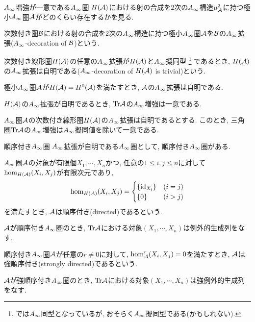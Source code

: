 \documentclass[aspectratio=169, dvipdfmx, 8pt, notheorems, uplatex]{beamer}
\begin{document}
\begin{frame}{$\Ainf$増強が一意である$\Ainf$圏}
  $H(\mathcal{A})$における射の合成を$2$次の$\Ainf$構造$\mu^2_{\mathcal{A}}$に持つ極小$\Ainf$圏$\mathcal{A}$がどのくらい存在するかを見る. 

  \begin{definition}[$\Ainf$拡張]
    次数付き圏$\mathcal{B}$における射の合成を$2$次の$\Ainf$構造に持つ極小$\Ainf$圏$\mathcal{A}$を$\mathcal{B}$の$\Ainf$拡張($\Ainf$-decoration of $\mathcal{B}$)という. 
  \end{definition}

  \begin{definition}
    次数付き線形圏$H(\mathcal{A})$の任意の$\Ainf$拡張が$H(\mathcal{A})$と$\Ainf$擬同型
    \footnote{
      \cite{Kaj4}では$\Ainf$同型となっているが, おそらく$\Ainf$擬同型である(かもしれない).
    }
    であるとき, $H(\mathcal{A})$の$\Ainf$拡張は自明である($\Ainf$-decoration of $H(\mathcal{A})$ is trivial)という. 
  \end{definition}

  \begin{example}
    極小$\Ainf$圏$\mathcal{A}$が$H(\mathcal{A}) = H^0(\mathcal{A})$を満たすとき, $\mathcal{A}$の$\Ainf$拡張は自明である. 
  \end{example} 

  $H(\mathcal{A})$の$\Ainf$拡張が自明であるとき, $\mathrm{Tr}\mathcal{A}$の$\Ainf$増強は一意である. 

  \begin{theorem} \label{prop_trivial_Ainf_decoration_induces_unique_Ainf_enhancement}
    $\Ainf$圏$\mathcal{A}$の次数付き線形圏$H(\mathcal{A})$の$\Ainf$拡張は自明であるとする. 
    このとき, 三角圏$\mathrm{Tr}\mathcal{A}$の$\Ainf$増強は$\Ainf$擬同値を除いて一意である. 
  \end{theorem}
\end{frame}

\begin{frame}{順序付き$\Ainf$圏}
  $\Ainf$拡張が自明である$\Ainf$圏として, 順序付き$\Ainf$圏がある. 

  \begin{definition}[順序付き]
    $\Ainf$圏$\mathcal{A}$の対象が有限個$X_1,\cdots,X_n$かつ, 任意の$1 \leq i,j \leq n$に対して$\hom_{H(\mathcal{A})}(X_i,X_j)$が有限次元であり, 
    \begin{align*}
      \hom_{H(\mathcal{A})}(X_i,X_j) =
      \begin{cases}
        \{\mathrm{id}_{X_i}\} & (i=j) \\
        \{0\} & (i>j)
      \end{cases}
    \end{align*}
    を満たすとき, $\mathcal{A}$は順序付き(directed)であるという. 
  \end{definition}

  $\mathcal{A}$が順序付き$\Ainf$圏のとき, $\mathrm{Tr}\mathcal{A}$における対象$(X_1,\cdots,X_n)$は例外的生成列をなす. 

  \begin{definition}[強順序付き]
    順序付き$\Ainf$圏$\mathcal{A}$が任意の$r \neq 0$に対して, $\hom^r_{\mathcal{A}}(X_i,X_j) = 0$を満たすとき, $\mathcal{A}$は強順序付き(strongly directed)であるという. 
  \end{definition}

  $\mathcal{A}$が強順序付き$\Ainf$圏のとき, $\mathrm{Tr}\mathcal{A}$における対象$(X_1,\cdots,X_n)$は強例外的生成列をなす.
\end{frame}
\end{document}
